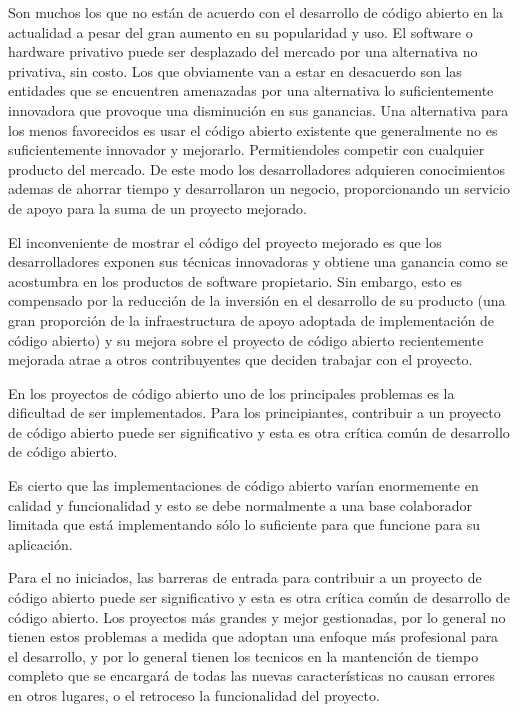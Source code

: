Son muchos los que no están de acuerdo con el desarrollo de código abierto en la actualidad a pesar del gran aumento en su popularidad y uso. El software o hardware privativo puede ser desplazado del mercado por una alternativa no privativa, sin costo. Los que obviamente van a estar en desacuerdo son las entidades que se encuentren amenazadas por una alternativa lo suficientemente innovadora que provoque una disminución en sus ganancias. Una alternativa para los menos favorecidos es usar el código abierto existente que generalmente no es suficientemente innovador y mejorarlo. Permitiendoles competir con cualquier producto del mercado. De este modo los desarrolladores adquieren conocimientos ademas de ahorrar tiempo y desarrollaron un negocio, proporcionando un servicio de apoyo para la suma de un proyecto mejorado.


El inconveniente de mostrar el código del proyecto mejorado es que los desarrolladores exponen sus técnicas innovadoras y obtiene una ganancia como se acostumbra en los productos de software propietario. Sin embargo, esto es compensado por la reducción de la inversión en el desarrollo de su producto (una gran proporción de
la infraestructura de apoyo adoptada de implementación de código abierto) y su mejora sobre el proyecto de código abierto recientemente mejorada atrae a otros contribuyentes que deciden trabajar con el proyecto.

En los proyectos de código abierto uno de los principales problemas es la dificultad de ser implementados. Para los principiantes, contribuir a un proyecto de código abierto puede
ser significativo y esta es otra crítica común de desarrollo de código abierto.



Es cierto que las implementaciones de código abierto varían enormemente
en calidad y funcionalidad y esto se debe normalmente a una base colaborador limitada que está implementando sólo lo suficiente para que funcione para su aplicación. 

Para el no iniciados, las barreras de entrada para contribuir a un proyecto de código abierto puede
ser significativo y esta es otra crítica común de desarrollo de código abierto.
Los proyectos más grandes y mejor gestionadas, por lo general no tienen estos problemas a medida que adoptan una
enfoque más profesional para el desarrollo, y por lo general tienen los tecnicos en la mantención de tiempo completo
que se encargará de todas las nuevas características no causan errores en otros lugares, o el retroceso
la funcionalidad del proyecto.

